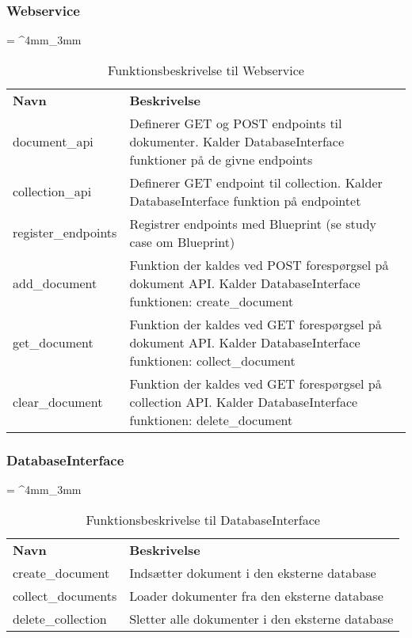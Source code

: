 \begin{appendices}
\subsubsection{Webservice}
\begin{table}[H]
	\renewcommand{\arraystretch}{2}
	\centering
	\sffamily
	\tabulinesep = ^4mm_3mm
	\begin{tabu}{ m{4cm}  m{8.5cm} }
		\color{white}\bfseries Navn &\color{white}\bfseries Beskrivelse \\
		document\_api & Definerer GET og POST endpoints til dokumenter. Kalder DatabaseInterface funktioner på de givne endpoints \\
		collection\_api & Definerer GET endpoint til collection. Kalder DatabaseInterface funktion på endpointet \\
		register\_endpoints & Registrer endpoints med Blueprint (se study case om Blueprint) \\
		add\_document & Funktion der kaldes ved POST forespørgsel på dokument API. Kalder DatabaseInterface funktionen: create\_document \\
		get\_document & Funktion der kaldes ved GET forespørgsel på dokument API. Kalder DatabaseInterface funktionen: collect\_document\\
		clear\_document & Funktion der kaldes ved GET forespørgsel på collection API. Kalder DatabaseInterface funktionen: delete\_document \\
	\end{tabu}
	\caption{Funktionsbeskrivelse til Webservice}
	\label{tab:func_descr_webservice}
\end{table}
\pagebreak 

\subsubsection{DatabaseInterface}
\begin{table}[H]
	\renewcommand{\arraystretch}{2}
	\centering
	\sffamily
	\tabulinesep = ^4mm_3mm
	\begin{tabu}{ m{4cm}  m{8.5cm} }
		\color{white}\bfseries Navn &\color{white}\bfseries Beskrivelse \\
		create\_document & Indsætter dokument i den eksterne database \\
		collect\_documents & Loader dokumenter fra den eksterne database \\
		delete\_collection & Sletter alle dokumenter i den eksterne database \\
	\end{tabu}
	\caption{Funktionsbeskrivelse til DatabaseInterface}
	\label{tab:func_descr_databaseinterface}
\end{table}


\end{appendices}
